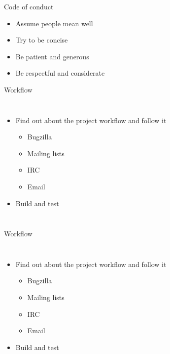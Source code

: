 \documentclass{beamer}
\begin{document}
\begin{frame}{Code of conduct}
  \begin{itemize}
  \item
    Assume people mean well
  \item
    Try to be concise
  \item
    Be patient and generous
  \item
    Be respectful and considerate
  \end{itemize}
\end{frame}

\begin{frame}{Workflow}
  \begin{columns}
    \begin{itemize}
    \item
      Find out about the project workflow and follow it
      \begin{itemize}
      \item
        Bugzilla
      \item
        Mailing lists
      \item
        IRC
      \item
        Email
      \end{itemize}
    \item
      Build and test
    \end{itemize}
  \end{columns}
\end{frame}

\begin{frame}{Workflow}
  \begin{columns}
    \begin{itemize}
    \item
      Find out about the project workflow and follow it
      \begin{itemize}
      \item
        \alert{Bugzilla}
      \item
        Mailing lists
      \item
        IRC
      \item
        Email
      \end{itemize}
    \item
      Build and test
    \end{itemize}
  \end{columns}
\end{frame}
\end{document}
